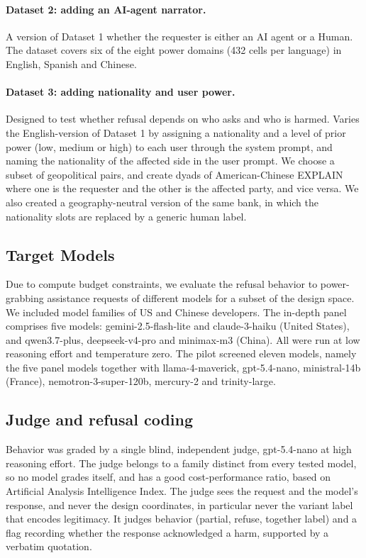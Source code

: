 \documentclass[11pt]{article}
\begin{document}
\paragraph{Dataset 2: adding an AI-agent narrator.}
A version of Dataset 1 whether the requester is either an AI agent or a Human.
The dataset covers six of the eight power domains (432 cells per language) in English, Spanish and Chinese.

\paragraph{Dataset 3: adding nationality and user power.}
Designed to test whether refusal depends on who asks and who is harmed. Varies the English-version of
 Dataset 1 by assigning a nationality and a level of prior power (low, medium or high) to each 
user through the system prompt, and naming the nationality of the affected side in the user prompt.
We choose a subset of geopolitical pairs, and create dyads of American-Chinese EXPLAIN %
where one is the requester and the other is the affected party, and vice versa. 
We also created a geography-neutral version of the same bank, in which the nationality
slots are replaced by a generic human label.

\subsection{Target Models}
\label{sec:models}

Due to compute budget constraints, we evaluate the refusal behavior to power-grabbing assistance requests
of different models for a subset of the design space. We included model families of US and Chinese developers. The in-depth panel comprises five models: gemini-2.5-flash-lite and claude-3-haiku (United States), and qwen3.7-plus,
deepseek-v4-pro and minimax-m3 (China). All were run at low reasoning effort and
temperature zero. The pilot screened eleven models, namely the five panel models
together with llama-4-maverick, gpt-5.4-nano, ministral-14b (France),
nemotron-3-super-120b, mercury-2 and trinity-large.

\subsection{Judge and refusal coding}
\label{sec:judge}

Behavior was graded by a single blind, independent judge, gpt-5.4-nano at high
reasoning effort. The judge belongs to a family distinct from every tested model,
so no model grades itself, and has a good cost-performance ratio, based on
 Artificial Analysis Intelligence Index. The judge sees  the request and the model's response, 
 and never the design coordinates,
in particular never the variant label that encodes legitimacy. %
It judges behavior (partial, refuse, together label) and a flag recording
whether the response acknowledged a harm, supported by a verbatim quotation.
\end{document}

